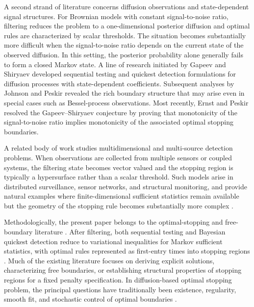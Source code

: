 \documentclass[pdflatex,sn-mathphys-num]{sn-jnl}
\theoremstyle{plain}
\theoremstyle{definition}
\begin{document}
A second strand of literature concerns diffusion observations and
state-dependent signal structures. For Brownian models with constant
signal-to-noise ratio, filtering reduces the problem to a one-dimensional
posterior diffusion and optimal rules are characterized by scalar thresholds.
The situation becomes substantially more difficult when the signal-to-noise
ratio depends on the current state of the observed diffusion. In this setting,
the posterior probability alone generally fails to form a closed Markov state.
A line of research initiated by Gapeev and Shiryaev
\citep{gapeev2011sequential,gapeev2013bayesian} developed sequential testing
and quickest detection formulations for diffusion processes with
state-dependent coefficients. Subsequent analyses by Johnson and Peskir
\citep{johnson2017quickest,yu2026from,johnson2018sequential} revealed the rich boundary
structure that may arise even in special cases such as Bessel-process
observations. Most recently, Ernst and Peskir
\citep{ernst2024gapeev} resolved the Gapeev--Shiryaev conjecture by proving
that monotonicity of the signal-to-noise ratio implies monotonicity of the
associated optimal stopping boundaries.

A related body of work studies multidimensional and multi-source detection
problems. When observations are collected from multiple sensors or coupled
systems, the filtering state becomes vector valued and the stopping region is
typically a hypersurface rather than a scalar threshold. Such models arise in
distributed surveillance, sensor networks, and structural monitoring, and
provide natural examples where finite-dimensional sufficient statistics remain
available but the geometry of the stopping rule becomes substantially more
complex \cite{ludkovski2012bayesian,zhang2014quickest,kurt2018multisensor,konev2017quickest,didi2024active,dayanik2016sequential}.

Methodologically, the present paper belongs to the optimal-stopping and
free-boundary literature \cite{peskir2006optimal}. After filtering, both sequential testing and
Bayesian quickest detection reduce to variational inequalities for Markov
sufficient statistics, with optimal rules represented as first-entry times
into stopping regions
\citep{peskir2000sequential,ekstrom2022multi,
epstein2022optimal,ankirchner2020bayesian}. Much of the existing literature
focuses on deriving explicit solutions, characterizing free boundaries, or
establishing structural properties of stopping regions for a fixed penalty
specification. In diffusion-based optimal stopping problem, the principal questions
have traditionally been existence, regularity, smooth fit, and
stochastic control of optimal boundaries \cite{peskir2019continuity,arkin2009variational,oshima2006optimal,oksendal2019applied}.
\end{document}
